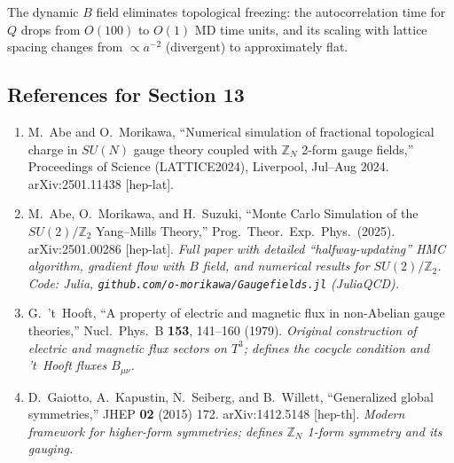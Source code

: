 \documentclass[12pt,a4paper]{article}
\begin{document}
The dynamic $B$ field eliminates topological freezing: the autocorrelation time
for $Q$ drops from $O(100)$ to $O(1)$ MD time units, and its scaling with
lattice spacing changes from $\propto a^{-2}$ (divergent) to approximately flat.

\subsection*{References for Section 13}

\begin{enumerate}
  \item M.~Abe and O.~Morikawa,
    ``Numerical simulation of fractional topological charge in $SU(N)$ gauge theory
    coupled with $\mathbb{Z}_N$ 2-form gauge fields,''
    Proceedings of Science (LATTICE2024), Liverpool, Jul--Aug 2024.
    arXiv:2501.11438 [hep-lat].

  \item M.~Abe, O.~Morikawa, and H.~Suzuki,
    ``Monte Carlo Simulation of the $SU(2)/\mathbb{Z}_2$ Yang--Mills Theory,''
    Prog.\ Theor.\ Exp.\ Phys.\ (2025).
    arXiv:2501.00286 [hep-lat].
    \textit{Full paper with detailed ``halfway-updating'' HMC algorithm,
    gradient flow with $B$ field, and numerical results for $SU(2)/\mathbb{Z}_2$.
    Code: Julia, \texttt{github.com/o-morikawa/Gaugefields.jl} (JuliaQCD).}

  \item G.~'t~Hooft,
    ``A property of electric and magnetic flux in non-Abelian gauge theories,''
    Nucl.\ Phys.\ B \textbf{153}, 141--160 (1979).
    \textit{Original construction of electric and magnetic flux sectors
    on $T^3$; defines the cocycle condition and 't~Hooft fluxes $B_{\mu\nu}$.}

  \item D.~Gaiotto, A.~Kapustin, N.~Seiberg, and B.~Willett,
    ``Generalized global symmetries,''
    JHEP \textbf{02} (2015) 172. arXiv:1412.5148 [hep-th].
    \textit{Modern framework for higher-form symmetries;
    defines $\mathbb{Z}_N$ 1-form symmetry and its gauging.}
\end{enumerate}
\end{document}
